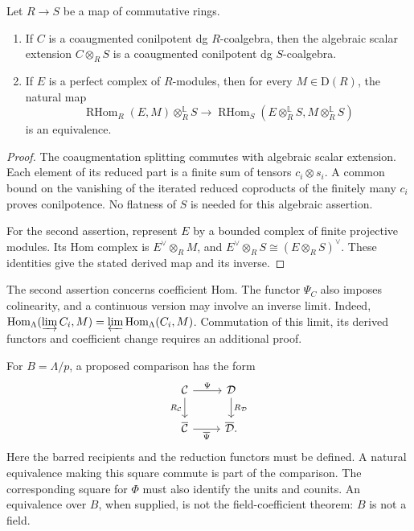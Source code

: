 \begin{lemma}
\label{v4-arith:pos:lem:base-change}
Let \(R\to S\) be a map of commutative rings.
\begin{enumerate}
\item If \(C\) is a coaugmented conilpotent dg \(R\)-coalgebra,
then the algebraic scalar extension \(C\otimes_R S\)
is a coaugmented conilpotent dg \(S\)-coalgebra.
\item If \(E\) is a perfect complex of \(R\)-modules, then
for every \(M\in\mathrm D(R)\), the natural map
\[
 \operatorname{RHom}_R(E,M)\otimes_R^{\mathbb L}S
 \longrightarrow
 \operatorname{RHom}_S
   (E\otimes_R^{\mathbb L}S,M\otimes_R^{\mathbb L}S)
\]
is an equivalence.
\end{enumerate}
\end{lemma}
\begin{proof}
The coaugmentation splitting commutes with algebraic scalar
extension. Each element of its reduced part is a finite sum
of tensors \(c_i\otimes s_i\). A common bound on the vanishing
of the iterated reduced coproducts of the finitely many \(c_i\)
proves conilpotence. No flatness of \(S\) is needed for this
algebraic assertion.

For the second assertion, represent \(E\) by a bounded complex
of finite projective modules. Its Hom complex is
\(E^\vee\otimes_R M\), and
\(E^\vee\otimes_R S\cong(E\otimes_R S)^\vee\).
These identities give the stated derived map and its inverse.
\end{proof}

The second assertion concerns coefficient Hom.
The functor \(\Psi_C\) also imposes colinearity, and a
continuous version may involve an inverse limit.
Indeed, \(\operatorname{Hom}_\Lambda(\varinjlim C_i,M)
=\varprojlim\operatorname{Hom}_\Lambda(C_i,M)\).
Commutation of this limit, its derived functors and coefficient
change requires an additional proof.

For \(B=\Lambda/p\), a proposed comparison has the form
\begin{equation}
\label{v4-arith:pos:eq:base-change-diagram}
\begin{tikzcd}
 \mathcal C\arrow[r,"\Psi"]\arrow[d,"R_{\mathcal C}"']
 &\mathcal D\arrow[d,"R_{\mathcal D}"]\\
 \overline{\mathcal C}\arrow[r,"\overline\Psi"']
 &\overline{\mathcal D}.
\end{tikzcd}
\end{equation}
Here the barred recipients and the reduction functors must be
defined. A natural equivalence making this square commute is
part of the comparison. The corresponding square for \(\Phi\)
must also identify the units and counits.
An equivalence over \(B\), when supplied, is not the
field-coefficient theorem: \(B\) is not a field.

